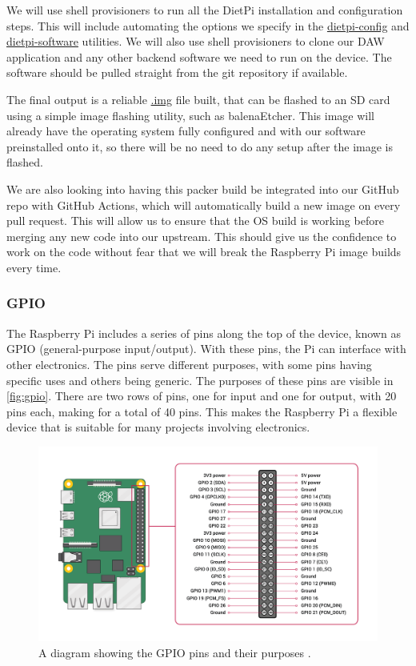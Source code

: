 We will use shell provisioners to run all the DietPi installation and configuration steps.
This will include automating the options we specify in the \url{dietpi-config} and
\url{dietpi-software} utilities. We will also use shell provisioners to clone our DAW
application and any other backend software we need to run on the device. The software
should be pulled straight from the git repository if available.

The final output is a reliable \url{.img} file built, that can be flashed to an SD card
using a simple image flashing utility, such as balenaEtcher. This image will already have
the operating system fully configured and with our software preinstalled onto it, so there
will be no need to do any setup after the image is flashed.

We are also looking into having this packer build be integrated into our GitHub repo with
GitHub Actions, which will automatically build a new image on every pull request. This
will allow us to ensure that the OS build is working before merging any new code into our
upstream. This should give us the confidence to work on the code without fear that we will
break the Raspberry Pi image builds every time.

\subsubsection{GPIO}

The Raspberry Pi includes a series of pins along the top of the device, known as GPIO
(general-purpose input/output). With these pins, the Pi can interface with other
electronics. The pins serve different purposes, with some pins having specific uses and
others being generic. The purposes of these pins are visible in \autoref{fig:gpio}. There
are two rows of pins, one for input and one for output, with 20 pins each, making for a
total of 40 pins. This makes the Raspberry Pi a flexible device that is suitable for many
projects involving electronics.

\begin{figure}
  \centerline{ \includegraphics[width=\linewidth]{image/gpio.png} }
  \caption{A diagram showing the GPIO pins and their purposes \autocite{gpio}.}
  \label{fig:gpio}
\end{figure}

